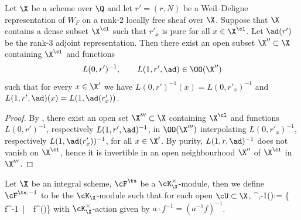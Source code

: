 \begin{lemm}\label{interp Lv} Let $\X$ be a scheme over $\Q$ and let   $r'=(r, N)$ be a Weil--Deligne representation  of $W_{F}$
on a rank-$2$ locally free sheaf over $\X$.  Suppose that $\X$ contains a  dense subset $\X^{\cl}$ such that $r'_{x}$ is pure for all $x\in \X^{\cl}$. Let $\ad(r')$ be the rank-$3$ adjoint representation. Then there exist an open subset $\X''\subset \X$ containing $\X^{\cl }$ and functions
$$L(0, r')^{-1}, \qquad L(1, r', \ad)\in \OO(\X'')$$
such that for every $x\in \X'$ we have $L(0, r')^{-1}(x)=L(0, r'_{x})^{-1}$ and $L(1, r', \ad)(x)=L(1, \ad(r'_{x}))$.
\end{lemm}
\begin{proof}
By  \cite[\S~5.1]{LLC},
 there exist an open set $\X'''\subset \X$ containing $\X^{\cl}$ and functions
 $L(0, r')^{-1}$, respectively $L(1, r', \ad)^{-1}$, in $\OO(\X''')$ interpolating $L(0, r'_{x})^{-1}$, respectively $L(1, \ad(r'_{x}))^{-1}$, for all $x\in \X'$.  By purity, $L(1,r, \ad)^{-1}$ does not vanish on $\X^{\cl}$, hence it is invertible in an open neighbourhood $\X''$ of $\X^{\cl}$ in $\X'''$.
\end{proof}


 Let $\X$ be an integral scheme,  $\cF^{\ts}$ be a $\cK_{\X}^{\times}$-module, then we define $\cF^{\ts,-1}$ to be the $\cK_{\X}$-module such that for each open $\cU\subset \X$,
\beqq
\cF^{\ts,-1}(\cU):= \{ f^{-1}\, |\ \ f\in \cF^{\ts}(\cU)\}\eeqq
  with $\cK_{\X}^{\times}$-action given by $a\cdot f^{-1}=(a^{-1}f)^{-1}$.



